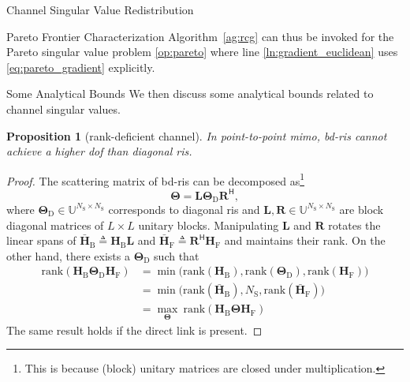 \documentclass[journal]{IEEEtran}
\newtheorem{proposition}{Proposition}
\begin{document}
\begin{section}{Channel Singular Value Redistribution}
\begin{subsection}{Pareto Frontier Characterization}
		Algorithm~\ref{ag:rcg} can thus be invoked for the Pareto singular value problem \eqref{op:pareto} where line \ref{ln:gradient_euclidean} uses \eqref{eq:pareto_gradient} explicitly.
	\end{subsection}

	\begin{subsection}{Some Analytical Bounds}
		We then discuss some analytical bounds related to channel singular values.
		\begin{proposition}[rank-deficient channel]
			In point-to-point \gls{mimo}, \gls{bd}-\gls{ris} cannot achieve a higher \gls{dof} than diagonal \gls{ris}.
		\end{proposition}
		\begin{proof}
			The scattering matrix of \gls{bd}-\gls{ris} can be decomposed as\footnote{This is because (block) unitary matrices are closed under multiplication.}
			\begin{equation}
				\mathbf{\Theta} = \mathbf{L} \mathbf{\Theta}_\mathrm{D} \mathbf{R}^\mathsf{H},
			\end{equation}
			where $\mathbf{\Theta}_\mathrm{D} \in \mathbb{U}^{N_\mathrm{S} \times N_\mathrm{S}}$ corresponds to diagonal \gls{ris} and $\mathbf{L}, \mathbf{R} \in \mathbb{U}^{N_\mathrm{S} \times N_\mathrm{S}}$ are block diagonal matrices of $L \times L$ unitary blocks.
			Manipulating $\mathbf{L}$ and $\mathbf{R}$ rotates the linear spans of $\bar{\mathbf{H}}_\mathrm{B} \triangleq \mathbf{H}_\mathrm{B} \mathbf{L}$ and $\bar{\mathbf{H}}_\mathrm{F} \triangleq \mathbf{R}^\mathsf{H} \mathbf{H}_\mathrm{F}$ and maintains their rank.
			On the other hand, there exists a $\mathbf{\Theta}_\mathrm{D}$ such that
			\begin{equation*}
				\begin{split}
					\mathrm{rank}(\mathbf{H}_\mathrm{B} \mathbf{\Theta}_\mathrm{D} \mathbf{H}_\mathrm{F})
					& = \min \bigl( \mathrm{rank}(\mathbf{H}_\mathrm{B}), \mathrm{rank}(\mathbf{\Theta}_\mathrm{D}), \mathrm{rank}(\mathbf{H}_\mathrm{F}) \bigr) \\
					& = \min \bigl( \mathrm{rank}(\bar{\mathbf{H}}_\mathrm{B}), N_\mathrm{S}, \mathrm{rank}(\bar{\mathbf{H}}_\mathrm{F}) \bigr) \\
					& = \max_\mathbf{\Theta} \ \mathrm{rank}(\mathbf{H}_\mathrm{B} \mathbf{\Theta} \mathbf{H}_\mathrm{F})
				\end{split}
			\end{equation*}
			The same result holds if the direct link is present.
		\end{proof}


\end{subsection}
\end{section}
\end{document}
